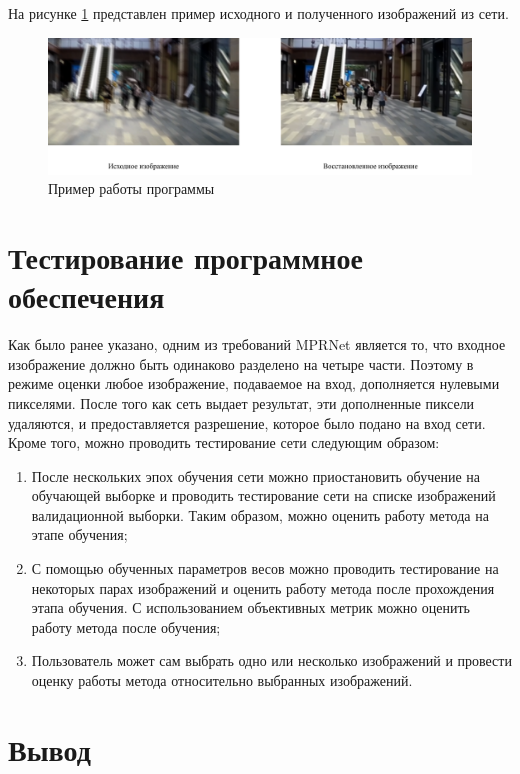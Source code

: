 На рисунке \ref{fig:demo} представлен пример исходного и полученного изображений из сети.
\begin{figure}[H]
    \centering
    \includegraphics[width=1.0\textwidth]{assets/predict-result.png}
    \caption{Пример работы программы}
    \label{fig:demo}
\end{figure}

\section{Тестирование программное обеспечения}

Как было ранее указано, одним из требований MPRNet является то, что входное изображение должно быть одинаково разделено на четыре части. Поэтому в режиме оценки любое изображение, подаваемое на вход, дополняется нулевыми пикселями. После того как сеть выдает результат, эти дополненные пиксели удаляются, и предоставляется разрешение, которое было подано на вход сети. Кроме того, можно проводить тестирование сети следующим образом:

\begin{enumerate}[left=0.49cm]
    \item После нескольких эпох обучения сети можно приостановить обучение на обучающей выборке и проводить тестирование сети на списке изображений валидационной выборки. Таким образом, можно оценить работу метода на этапе обучения;
    \item С помощью обученных параметров весов можно проводить тестирование на некоторых парах изображений и оценить работу метода после прохождения этапа обучения. С использованием объективных метрик можно оценить работу метода после обучения;
    \item Пользователь может сам выбрать одно или несколько изображений и провести оценку работы метода относительно выбранных изображений.
\end{enumerate}

\section*{Вывод}

